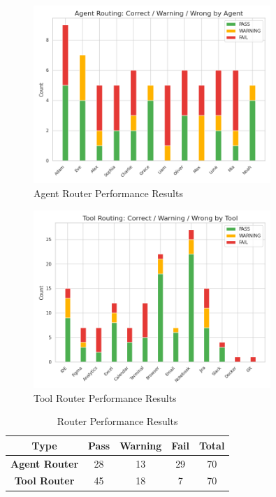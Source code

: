 \begin{figure}[H]
    \centering
    \includegraphics[width=0.8\textwidth]{figures/plots/agent_routing_per_agent.png}
    \caption{Agent Router Performance Results}
    \label{fig:agent-router-results}
\end{figure}

\begin{figure}[H]
    \centering
    \includegraphics[width=0.8\textwidth]{figures/plots/tool_routing_per_tool.png}
    \caption{Tool Router Performance Results}
    \label{fig:tool-router-results}
\end{figure}


\begin{table}[H]
    \centering
    \begin{tabular}{|c|c|c|c|c|}
        \hline
        \textbf{Type} & \textbf{{Pass}} & \textbf{Warning} & \textbf{Fail} & \textbf{Total} \\
        \hline
        \hline
        \textbf{Agent Router} & 28 & 13 & 29 & 70 \\
        \textbf{Tool Router} & 45 & 18 & 7 & 70 \\
        \hline
    \end{tabular}
    \caption{Router Performance Results}
    \label{tab:router-results}
\end{table}

